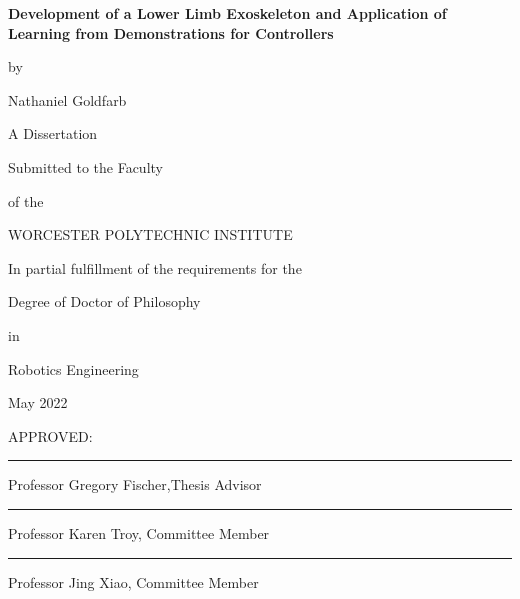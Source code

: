 \documentclass[12pt]{report}
\begin{document}
\newcommand{\brk}{\vspace*{0.18in}}

\thispagestyle{empty}

\begin{center}

\brk


   {\large 
	\textbf{
	Development of a Lower Limb Exoskeleton and Application of Learning from Demonstrations for Controllers
	}
   }


\brk
by

\brk
Nathaniel Goldfarb


\brk\brk
A Dissertation

\brk
Submitted to the Faculty

\brk
of the 

\brk
WORCESTER POLYTECHNIC INSTITUTE
	
\brk
In partial fulfillment of the requirements for the

\brk
Degree of Doctor of Philosophy

\brk
in

\brk
Robotics Engineering

\brk
May 2022

\end{center}

	
\vfill
APPROVED:

\vspace{0.25in}
\rule{3in}{0.8pt}

Professor Gregory Fischer,Thesis Advisor

\vspace{0.25in}
\rule{3in}{0.8pt}

Professor Karen Troy,  Committee Member


\vspace{0.25in}
\rule{3in}{0.8pt}

Professor Jing Xiao,  Committee Member
\end{document}
